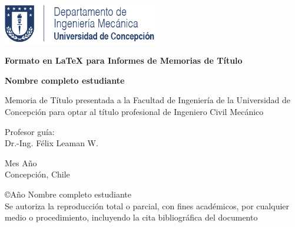 	
\begin{center}
	
\includegraphics[height=50pt]{udec-dim.png}
\vspace{5cm}


{\Large
\textbf{Formato en \LaTeX{} para Informes de Memorias de Título \\}
}
\vspace{2.5cm}

{\large
\textbf{Nombre completo estudiante\\}
}
\vspace{2.5cm}

{\normalsize
Memoria de Título presentada a la Facultad de Ingeniería de la Universidad de Concepción para optar al título profesional de Ingeniero Civil Mecánico\\
}
\vspace{2.5cm}


{\normalsize
Profesor guía:\\
Dr.-Ing. Félix Leaman W.
}
\vspace{0.5cm}

{\normalsize
Mes Año\\
Concepción, Chile
}
\vspace*{\fill}




\end{center}

{\footnotesize
\copyright Año Nombre completo estudiante\\
Se autoriza la reproducción total o parcial, con fines académicos, por cualquier medio o procedimiento, incluyendo la cita bibliográfica del documento
}
\vspace{0.5cm}

